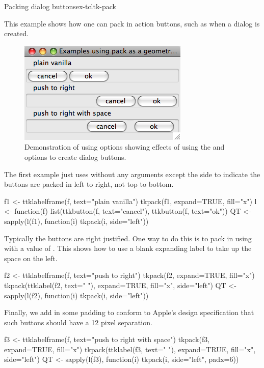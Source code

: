 \begin{example}{Packing dialog buttons}{ex-tcltk-pack}


This example shows how one can pack in action buttons, such as when a
dialog is created.

\begin{figure}
  \centering
  \includegraphics[width=.5\textwidth]{fig-tcltk-pack-buttons.png}
  \caption{Demonstration of using  options showing
    effects of using the 
    and  options to create
    dialog buttons.}
  \label{fig:tcltk-pack-buttons}
\end{figure}


The first example just uses  without any arguments except
the side to indicate the buttons are packed in left to right, not top
to bottom.
\begin{Schunk}
\begin{Sinput}
 f1 <- ttklabelframe(f, text="plain vanilla")
 tkpack(f1, expand=TRUE, fill="x")
 l <- function(f) 
   list(ttkbutton(f, text="cancel"), ttkbutton(f, text="ok"))
 QT <- sapply(l(f1), function(i) tkpack(i, side="left"))
\end{Sinput}
\end{Schunk}

Typically the buttons are right justified. One way to do this is to
pack in using  with a value of . This shows
how to use a blank expanding label to take up the space on the left.
\begin{Schunk}
\begin{Sinput}
 f2 <- ttklabelframe(f, text="push to right")
 tkpack(f2, expand=TRUE, fill="x")
 tkpack(ttklabel(f2, text=" "), expand=TRUE, fill="x", side="left")
 QT <- sapply(l(f2), function(i) tkpack(i, side="left"))
\end{Sinput}
\end{Schunk}

Finally, we add in some padding to conform to Apple's design specification that such
buttons should have a 12 pixel separation.
\begin{Schunk}
\begin{Sinput}
 f3 <- ttklabelframe(f, text="push to right with space")
 tkpack(f3, expand=TRUE, fill="x")
 tkpack(ttklabel(f3, text=" "), expand=TRUE, fill="x", side="left")
 QT <- sapply(l(f3), function(i) tkpack(i, side="left", padx=6))
\end{Sinput}
\end{Schunk}
\end{example}

